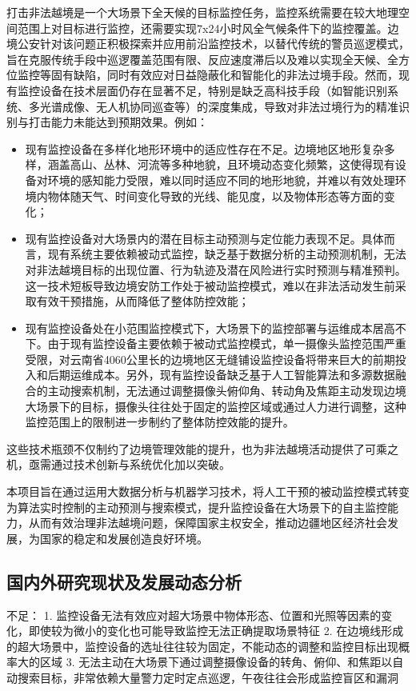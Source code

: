 打击非法越境是一个大场景下全天候的目标监控任务，监控系统需要在较大地理空间范围上对目标进行监控，还需要实现7x24小时风全气候条件下的监控覆盖。边境公安针对该问题正积极探索并应用前沿监控技术，以替代传统的警员巡逻模式，旨在克服传统手段中巡逻覆盖范围有限、反应速度滞后以及难以实现全天候、全方位监控等固有缺陷，同时有效应对日益隐蔽化和智能化的非法过境手段。然而，现有监控设备在技术层面仍存在显著不足，特别是缺乏高科技手段（如智能识别系统、多光谱成像、无人机协同巡查等）的深度集成，导致对非法过境行为的精准识别与打击能力未能达到预期效果。例如：
\begin{itemize}[left=15pt,label={\textasteriskcentered}]
\item 现有监控设备在多样化地形环境中的适应性存在不足。边境地区地形复杂多样，涵盖高山、丛林、河流等多种地貌，且环境动态变化频繁，这使得现有设备对环境的感知能力受限，难以同时适应不同的地形地貌，并难以有效处理环境内物体随天气、时间变化导致的光线、能见度，以及物体形态等方面的变化；
\item 现有监控设备对大场景内的潜在目标主动预测与定位能力表现不足。具体而言，现有系统主要依赖被动式监控，缺乏基于数据分析的主动预测机制，无法对非法越境目标的出现位置、行为轨迹及潜在风险进行实时预测与精准预判。这一技术短板导致边境安防工作处于被动监控模式，难以在非法活动发生前采取有效干预措施，从而降低了整体防控效能；
\item 现有监控设备处在小范围监控模式下，大场景下的监控部署与运维成本居高不下。由于现有监控设备主要依赖于被动式监控模式，单一摄像头监控范围严重受限，对云南省4060公里长的边境地区无缝铺设监控设备将带来巨大的前期投入和后期运维成本。另外，现有监控设备缺乏基于人工智能算法和多源数据融合的主动搜索机制，无法通过调整摄像头俯仰角、转动角及焦距主动发现边境大场景下的目标，摄像头往往处于固定的监控区域或通过人力进行调整，这种监控范围上的限制进一步制约了整体防控效能的提升。
\end{itemize}
这些技术瓶颈不仅制约了边境管理效能的提升，也为非法越境活动提供了可乘之机，亟需通过技术创新与系统优化加以突破。


本项目旨在通过运用大数据分析与机器学习技术，将人工干预的被动监控模式转变为算法实时控制的主动预测与搜索模式，提升监控设备在大场景下的自主监控能力，从而有效治理非法越境问题，保障国家主权安全，推动边疆地区经济社会发展，为国家的稳定和发展创造良好环境。


\subsection{国内外研究现状及发展动态分析}




不足：
1. 监控设备无法有效应对超大场景中物体形态、位置和光照等因素的变化，即使较为微小的变化也可能导致监控无法正确提取场景特征
2. 在边境线形成的超大场景中，监控设备的选址往往较为固定，不能动态的调整和监控目标出现概率大的区域
3. 无法主动在大场景下通过调整摄像设备的转角、俯仰、和焦距以自动搜索目标，非常依赖大量警力定时定点巡逻，午夜往往会形成监控盲区和漏洞

